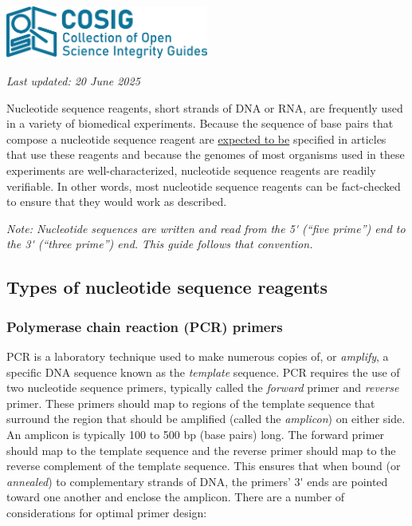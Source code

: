\documentclass[letterpaper, 12pt]{article}
\begin{document}
\flushleft\includegraphics[width=0.5\textwidth]{img/home/241017_final_logo_mockup.png}

\textit{Last updated: 20 June 2025}

Nucleotide sequence reagents, short strands of DNA or RNA, are frequently used in a variety of biomedical experiments. Because the sequence of base pairs that compose a nucleotide sequence reagent are \href{https://doi.org/10.1373/clinchem.2008.112797}{expected to be} specified in articles that use these reagents and because the genomes of most organisms used in these experiments are well-characterized, nucleotide sequence reagents are readily verifiable. In other words, most nucleotide sequence reagents can be fact-checked to ensure that they would work as described.

\textit{Note: Nucleotide sequences are written and read from the 5\'{} (``five prime'') end to the 3\'{} (``three prime'') end. This guide follows that convention.}

\subsection*{Types of nucleotide sequence reagents}

\subsubsection*{Polymerase chain reaction (PCR) primers}

PCR is a laboratory technique used to make numerous copies of, or \emph{amplify}, a specific DNA sequence known as the \emph{template} sequence. PCR requires the use of two nucleotide sequence primers, typically called the \emph{forward} primer and \emph{reverse} primer. These primers should map to regions of the template sequence that surround the region that should be amplified (called the \emph{amplicon}) on either side. An amplicon is typically 100 to 500 bp (base pairs) long. The forward primer should map to the template sequence and the reverse primer should map to the reverse complement of the template sequence. This ensures that when bound (or \emph{annealed}) to complementary strands of DNA, the primers' 3\'{} ends are pointed toward one another and enclose the amplicon. There are a number of considerations for optimal primer design:
\end{document}
